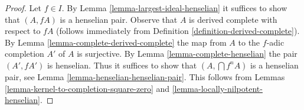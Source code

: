 \documentclass[10pt,a4paper]{amsart}
\theoremstyle{plain}
\theoremstyle{definition}
\theoremstyle{remark}
\numberwithin{equation}{subsection}
\begin{document}
\begin{proof}
Let $f \in I$. By Lemma \ref{lemma-largest-ideal-henselian}
it suffices to show that $(A, fA)$ is a henselian pair.
Observe that $A$ is derived complete with respect to $fA$
(follows immediately from Definition \ref{definition-derived-complete}).
By Lemma \ref{lemma-complete-derived-complete} the map from
$A$ to the $f$-adic completion $A'$ of $A$ is surjective.
By Lemma \ref{lemma-complete-henselian} the pair $(A', fA')$
is henselian. Thus it suffices to show that $(A, \bigcap f^nA)$
is a henselian pair, see Lemma \ref{lemma-henselian-henselian-pair}.
This follows from Lemmas \ref{lemma-kernel-to-completion-square-zero}
and \ref{lemma-locally-nilpotent-henselian}.
\end{proof}
\end{document}
